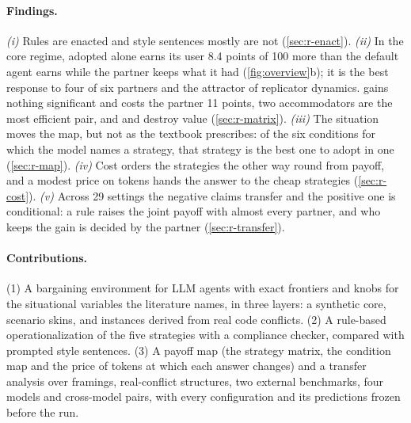 \paragraph{Findings.} \emph{(i)} Rules are enacted and style sentences mostly are not (\cref{sec:r-enact}). \emph{(ii)} In the core regime, \collaborating{} adopted alone earns its user 8.4 points of 100 more than the default agent earns while the partner keeps what it had (\cref{fig:overview}b); it is the best response to four of six partners and the attractor of replicator dynamics. \competing{} gains nothing significant and costs the partner 11 points, two accommodators are the most efficient pair, and \compromising{} and \avoiding{} destroy value (\cref{sec:r-matrix}). \emph{(iii)} The situation moves the map, but not as the textbook prescribes: of the six conditions for which the model names a strategy, that strategy is the best one to adopt in one (\cref{sec:r-map}). \emph{(iv)} Cost orders the strategies the other way round from payoff, and a modest price on tokens hands the answer to the cheap strategies (\cref{sec:r-cost}). \emph{(v)} Across 29 settings the negative claims transfer and the positive one is conditional: a \collaborating{} rule raises the joint payoff with almost every partner, and who keeps the gain is decided by the partner (\cref{sec:r-transfer}).

\paragraph{Contributions.} (1) A bargaining environment for LLM agents with exact frontiers and knobs for the situational variables the \tki{} literature names, in three layers: a synthetic core, scenario skins, and instances derived from real code conflicts. (2) A rule-based operationalization of the five strategies with a compliance checker, compared with prompted style sentences. (3) A payoff map (the strategy matrix, the condition map and the price of tokens at which each answer changes) and a transfer analysis over framings, real-conflict structures, two external benchmarks, four models and cross-model pairs, with every configuration and its predictions frozen before the run.

